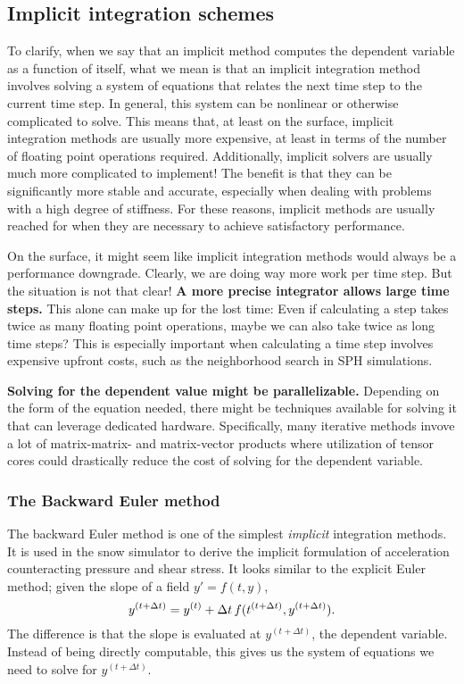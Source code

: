 \subsection{Implicit integration schemes}
\label{sqc:impl_int}
To clarify, when we say that an implicit method computes the
dependent variable as a function of itself, what we mean is that
an implicit integration method involves solving a
system of equations that relates the next time step to the current
time step\cite{fausto_nummat}. In general, this system can be nonlinear or otherwise
complicated to solve\cite{fausto_nummat}. This means that, at least on the surface,
implicit integration methods are usually more expensive, at least
in terms of the number of floating point operations required.
Additionally, implicit solvers are usually much more complicated
to implement!
The benefit is that they can be significantly more stable and accurate,
especially when dealing with problems with a high degree of stiffness.
For these reasons, implicit methods are usually reached for
when they are necessary to achieve satisfactory performance.

On the surface, it might seem like implicit integration methods would
always be a performance downgrade. Clearly, we are doing way more work
per time step.
But the situation is not that clear!
{\bf A more precise integrator allows large time steps.}
This alone can make up for the lost time:
Even if calculating a step takes twice as many floating point operations,
maybe we can also take twice as long time steps?
This is especially important when calculating a time step involves expensive
upfront costs, such as the neighborhood search in SPH simulations.

{\bf Solving for the dependent value might be parallelizable.}
Depending on the form of the equation needed, there might be
techniques available for solving it that can leverage dedicated hardware.
Specifically, many iterative methods invove a lot of matrix-matrix-
and matrix-vector products where utilization of tensor cores could
drastically reduce the cost of solving for the dependent variable.

\subsubsection*{The Backward Euler method}
The backward Euler method is one of the simplest {\em implicit} integration methods.
It is used in the snow simulator to derive the implicit formulation of
acceleration counteracting pressure and shear stress.
It looks similar to the explicit Euler method;
given the slope of a field $y' = f(t, y)$,
\begin{equation}
    y^{(t+\Delta t)} = y^{(t)} + \Delta t \, f(t^{(t + \Delta t)}, y^{(t + \Delta t)})
    \text.
\end{equation}
The difference is that the slope is evaluated at $y^{(t + \Delta t)}$, the dependent variable.
Instead of being directly computable, this gives us the system of equations we need to solve for
$y^{(t + \Delta t)}$.



